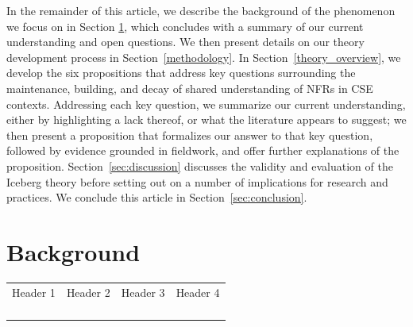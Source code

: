\documentclass[smallextended]{svjour3}
\begin{document}
In the remainder of this article, we describe the background of the phenomenon we focus on in Section \ref{background}, which concludes with a summary of our current understanding and open questions. We then present details on our theory development process in Section~\ref{methodology}.
In Section~\ref{theory_overview}, we develop the six propositions that address key questions surrounding the maintenance, building, and decay of shared understanding of NFRs in CSE contexts. Addressing each key question, we summarize our current understanding, either by highlighting a lack thereof, or what the  literature appears to suggest; we then present a proposition that formalizes our answer to that key question, followed by evidence grounded in fieldwork, and offer further explanations of the proposition. 
Section~\ref{sec:discussion} discusses the validity and evaluation of the Iceberg theory before setting out on a number of implications for research and practices. We conclude this article in Section~\ref{sec:conclusion}.


\section{Background}
\label{background}

\begin{center}
\begin{tabular}{>{\centering\arraybackslash}p{}>{\centering\arraybackslash}p{}>{\centering\arraybackslash}p{}>{\centering\arraybackslash}p{}}
Header 1 & Header 2 & Header 3 & Header 4 \\
 &  &  &  \\
 & \multicolumn{2}{l}{\multirow{2}{=}{}} &  \\
 & \multicolumn{2}{l}{} &  \\
 &  &  &  \\
\end{tabular}
\end{center}
\end{document}
